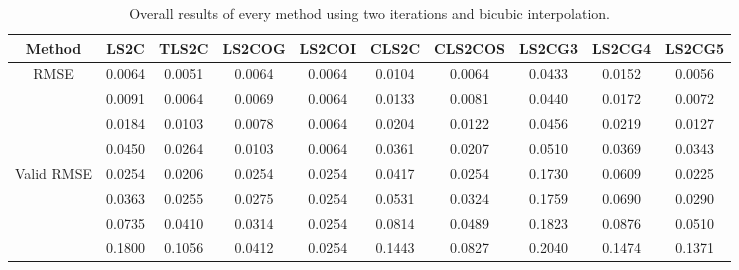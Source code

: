 \begin{table}[ht!]
\centering
\begin{tabular}{c|c|c|c|c|c|c|c|c|c}
Method & \scriptsize{LS2C} & \scriptsize{TLS2C} & \scriptsize{LS2COG} & \scriptsize{LS2COI} & \scriptsize{CLS2C} & \scriptsize{CLS2COS} & \scriptsize{LS2CG3} & \scriptsize{LS2CG4} & \scriptsize{LS2CG5}\\ \hline 
\multirow{4}{*}{RMSE} & 0.0064 & 0.0051 & 0.0064 & 0.0064 & 0.0104 & 0.0064 & 0.0433 & 0.0152 & 0.0056 \\ 
 & 0.0091 & 0.0064 & 0.0069 & 0.0064 & 0.0133 & 0.0081 & 0.0440 & 0.0172 & 0.0072 \\ 
 & 0.0184 & 0.0103 & 0.0078 & 0.0064 & 0.0204 & 0.0122 & 0.0456 & 0.0219 & 0.0127 \\ 
 & 0.0450 & 0.0264 & 0.0103 & 0.0064 & 0.0361 & 0.0207 & 0.0510 & 0.0369 & 0.0343 \\ 
 \hline
\multirow{4}{*}{Valid RMSE} & 0.0254 & 0.0206 & 0.0254 & 0.0254 & 0.0417 & 0.0254 & 0.1730 & 0.0609 & 0.0225 \\ 
 & 0.0363 & 0.0255 & 0.0275 & 0.0254 & 0.0531 & 0.0324 & 0.1759 & 0.0690 & 0.0290 \\ 
 & 0.0735 & 0.0410 & 0.0314 & 0.0254 & 0.0814 & 0.0489 & 0.1823 & 0.0876 & 0.0510 \\ 
 & 0.1800 & 0.1056 & 0.0412 & 0.0254 & 0.1443 & 0.0827 & 0.2040 & 0.1474 & 0.1371 \\ 
 \hline 
\end{tabular}
\caption{Overall results of every method using two iterations and bicubic interpolation.}
\label{tab:2itC}
\end{table}


